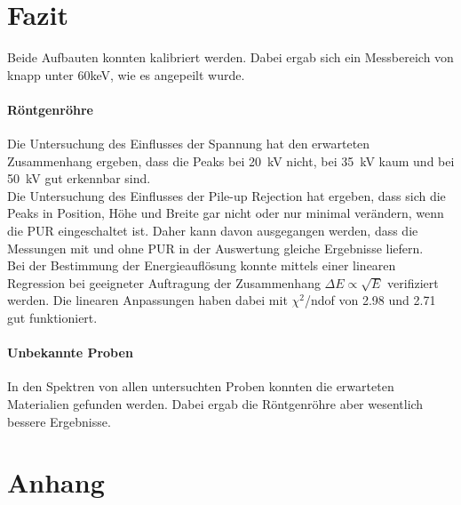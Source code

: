 \documentclass[12pt,a4paper]{article}
\begin{document}
\section{Fazit}
Beide Aufbauten konnten kalibriert werden. Dabei ergab sich ein Messbereich von knapp unter 60keV, wie es angepeilt wurde.

\paragraph{Röntgenröhre}
Die Untersuchung des Einflusses der Spannung hat den erwarteten Zusammenhang ergeben, dass die Peaks bei \SI{20}{kV} nicht, bei \SI{35}{kV} kaum und bei \SI{50}{kV} gut erkennbar sind. \\
Die Untersuchung des Einflusses der Pile-up Rejection hat ergeben, dass sich die Peaks in Position, Höhe und Breite gar nicht oder nur minimal verändern, wenn die PUR eingeschaltet ist. Daher kann davon ausgegangen werden, dass die Messungen mit und ohne PUR in der Auswertung gleiche Ergebnisse liefern. \\
Bei der Bestimmung der Energieauflösung konnte mittels einer linearen Regression bei geeigneter Auftragung der Zusammenhang $\Delta E \propto \sqrt{E}$ verifiziert werden. Die linearen Anpassungen haben dabei mit $\chi ^2$/ndof von 2.98 und 2.71 gut funktioniert.

\paragraph{Unbekannte Proben}
In den Spektren von allen untersuchten Proben konnten die erwarteten Materialien gefunden werden. Dabei ergab die Röntgenröhre aber wesentlich bessere Ergebnisse.


\newpage 
\section{Anhang}
\end{document}
